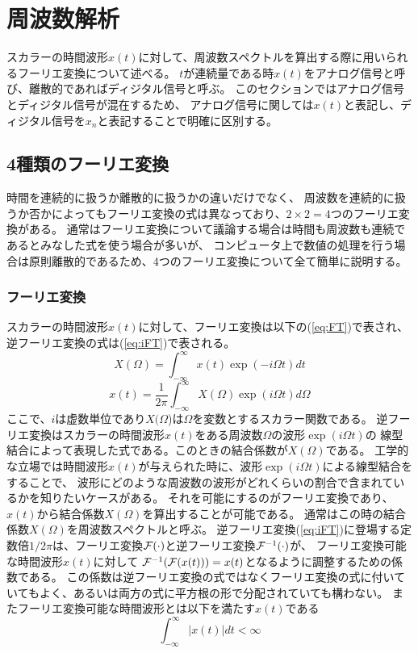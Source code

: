 
\section{周波数解析}
スカラーの時間波形\(x(t)\)に対して、周波数スペクトルを算出する際に用いられるフーリエ変換について述べる。
\(t\)が連続量である時\(x(t)\)をアナログ信号と呼び、離散的であればディジタル信号と呼ぶ。
このセクションではアナログ信号とディジタル信号が混在するため、
アナログ信号に関しては\(x(t)\)と表記し、ディジタル信号を\(x_n\)と表記することで明確に区別する。
\subsection{4種類のフーリエ変換}
時間を連続的に扱うか離散的に扱うかの違いだけでなく、
周波数を連続的に扱うか否かによってもフーリエ変換の式は異なっており、\(2\times 2 = 4\)つのフーリエ変換がある。
通常はフーリエ変換について議論する場合は時間も周波数も連続であるとみなした式を使う場合が多いが、
コンピュータ上で数値の処理を行う場合は原則離散的であるため、4つのフーリエ変換について全て簡単に説明する。

\subsubsection{フーリエ変換}
スカラーの時間波形\(x(t)\)に対して、フーリエ変換は以下の(\ref{eq:FT})で表され、
逆フーリエ変換の式は(\ref{eq:iFT})で表される。
\begin{equation}
    X(\Omega)=\int_{-\infty}^{\infty} x(t)\exp(-i\Omega t)dt
    \label{eq:FT}
\end{equation}
\begin{equation}
    x(t)=\frac{1}{2\pi} \int_{-\infty}^{\infty} X(\Omega)\exp(i\Omega t)d\Omega
    \label{eq:iFT}
\end{equation}
ここで、\(i\)は虚数単位であり\(X(\Omega\))は\(\Omega\)を変数とするスカラー関数である。
逆フーリエ変換はスカラーの時間波形\(x(t)\)をある周波数\(\Omega\)の波形\(\exp(i\Omega t)\)の
線型結合によって表現した式である。このときの結合係数が\(X(\Omega)\)である。
工学的な立場では時間波形\(x(t)\)が与えられた時に、波形\(\exp(i\Omega t)\)による線型結合をすることで、
波形にどのような周波数の波形がどれくらいの割合で含まれているかを知りたいケースがある。
それを可能にするのがフーリエ変換であり、\(x(t)\)から結合係数\(X(\Omega)\)を算出することが可能である。
通常はこの時の結合係数\(X(\Omega)\)を周波数スペクトルと呼ぶ。
逆フーリエ変換(\ref{eq:iFT})に登場する定数倍\(1/2\pi\)は、フーリエ変換\(\cal F(\cdot)\)と逆フーリエ変換\({\cal F}^{-1}(\cdot)\)が、
フーリエ変換可能な時間波形\(x(t)\)に対して
\({\cal F}^{-1}({\cal F}(x(t))) = x(t)\)となるように調整するための係数である。
この係数は逆フーリエ変換の式ではなくフーリエ変換の式に付いていてもよく、あるいは両方の式に平方根の形で分配されていても構わない。
またフーリエ変換可能な時間波形とは以下を満たす\(x(t)\)である
\begin{equation}
    \int_{-\infty}^{\infty}|x(t)|dt < \infty
\end{equation}

